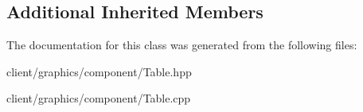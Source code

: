 \subsection*{Additional Inherited Members}


The documentation for this class was generated from the following files\-:\begin{DoxyCompactItemize}
\item 
client/graphics/component/Table.\-hpp\item 
client/graphics/component/Table.\-cpp\end{DoxyCompactItemize}
